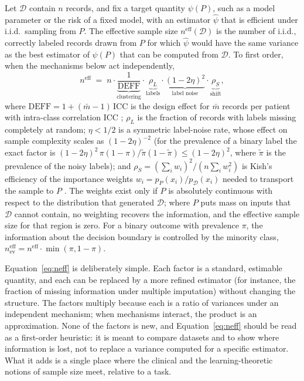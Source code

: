 \documentclass[acmsmall,screen,review]{acmart}
\newcommand{\eff}{\mathrm{eff}}
\theoremstyle{acmdefinition}
\begin{document}
\begin{definition}\label{def:ess}
Let $\mathcal{D}$ contain $n$ records, and fix a target quantity $\psi(P)$, such as a model parameter or the risk of a fixed model, with an estimator $\hat{\psi}$ that is efficient under i.i.d.\ sampling from $P$. The effective sample size $n^{\eff}(\mathcal{D})$ is the number of i.i.d., correctly labeled records drawn from $P$ for which $\hat{\psi}$ would have the same variance as the best estimator of $\psi(P)$ that can be computed from $\mathcal{D}$. To first order, when the mechanisms below act independently,
\begin{equation}\label{eq:neff}
n^{\eff} \;=\; n\cdot\underbrace{\frac{1}{\mathrm{DEFF}}}_{\text{clustering}}\cdot\underbrace{\rho_L}_{\text{labels}}\cdot\underbrace{(1-2\eta)^2}_{\text{label noise}}\cdot\underbrace{\rho_S}_{\text{shift}},
\end{equation}
where $\mathrm{DEFF}=1+(\bar{m}-1)\,\mathrm{ICC}$ is the design effect for $\bar{m}$ records per patient with intra-class correlation ICC \cite{kish1965survey}; $\rho_L$ is the fraction of records with labels missing completely at random; $\eta<1/2$ is a symmetric label-noise rate, whose effect on sample complexity scales as $(1-2\eta)^{-2}$ \cite{angluin1988learning} (for the prevalence of a binary label the exact factor is $(1-2\eta)^2\,\pi(1-\pi)/\tilde{\pi}(1-\tilde{\pi})\le(1-2\eta)^2$, where $\tilde{\pi}$ is the prevalence of the noisy labels); and $\rho_S=(\sum_i w_i)^2/(n\sum_i w_i^2)$ is Kish's efficiency of the importance weights $w_i=p_P(x_i)/p_{\mathcal{D}}(x_i)$ needed to transport the sample to $P$ \cite{kish1965survey}. The weights exist only if $P$ is absolutely continuous with respect to the distribution that generated $\mathcal{D}$; where $P$ puts mass on inputs that $\mathcal{D}$ cannot contain, no weighting recovers the information, and the effective sample size for that region is zero. For a binary outcome with prevalence $\pi$, the information about the decision boundary is controlled by the minority class, $n^{\eff}_{\mathrm{ev}}=n^{\eff}\cdot\min(\pi,1-\pi)$.
\end{definition}

Equation~\eqref{eq:neff} is deliberately simple. Each factor is a standard, estimable quantity, and each can be replaced by a more refined estimator (for instance, the fraction of missing information under multiple imputation) without changing the structure. The factors multiply because each is a ratio of variances under an independent mechanism; when mechanisms interact, the product is an approximation. None of the factors is new, and Equation~\eqref{eq:neff} should be read as a first-order heuristic: it is meant to compare datasets and to show where information is lost, not to replace a variance computed for a specific estimator. What it adds is a single place where the clinical and the learning-theoretic notions of sample size meet, relative to a task.
\end{document}
